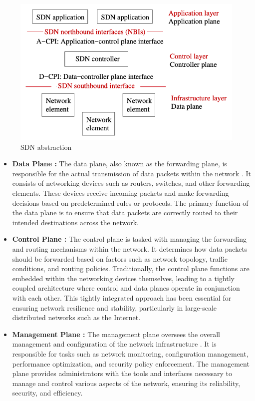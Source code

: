\begin{figure}[h]
  \centering
  \includegraphics[width=0.8\columnwidth]{figs/sdn.png}
  \caption{SDN abstraction }
  \label{fig:sdn_abs}
\end{figure}


\begin{itemize}
\item  \textbf{Data Plane :} The data plane, also known as the forwarding plane, is responsible for the actual transmission of data packets within the network \cite{tr2016sdn}. It consists of networking devices such as routers, switches, and other forwarding elements. These devices receive incoming packets and make forwarding decisions based on predetermined rules or protocols. The primary function of the data plane is to ensure that data packets are correctly routed to their intended destinations across the network.
\item  \textbf{Control Plane :} The control plane is tasked with managing the forwarding and routing mechanisms within the network\cite{tr2016sdn}. It determines how data packets should be forwarded based on factors such as network topology, traffic conditions, and routing policies. Traditionally, the control plane functions are embedded within the networking devices themselves, leading to a tightly coupled architecture where control and data planes operate in conjunction with each other. This tightly integrated approach has been essential for ensuring network resilience and stability, particularly in large-scale distributed networks such as the Internet.
\item \textbf{Management Plane :} The management plane oversees the overall management and configuration of the network infrastructure \cite{tr2016sdn}. It is responsible for tasks such as network monitoring, configuration management, performance optimization, and security policy enforcement. The management plane provides administrators with the tools and interfaces necessary to manage and control various aspects of the network, ensuring its reliability, security, and efficiency.
\end{itemize}

